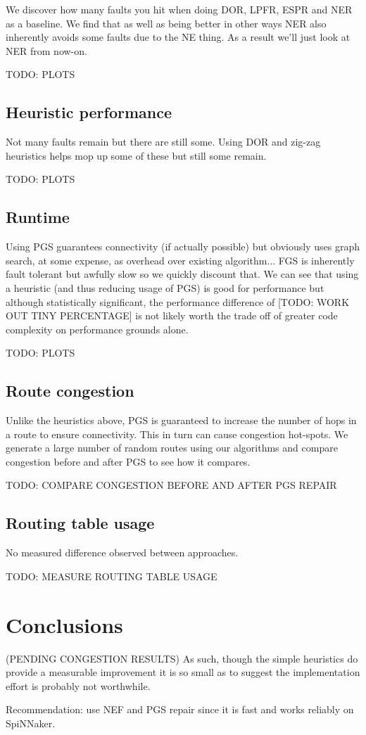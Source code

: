 			We discover how many faults you hit when doing DOR, LPFR, ESPR and NER
			as a baseline. We find that as well as being better in other ways NER
			also inherently avoids some faults due to the NE thing. As a result
			we'll just look at NER from now-on.
			
			TODO: PLOTS
		
		\subsection{Heuristic performance}
			
			Not many faults remain but there are still some. Using DOR and zig-zag
			heuristics helps mop up some of these but still some remain.
			
			TODO: PLOTS
		
		\subsection{Runtime}
			
			Using PGS guarantees connectivity (if actually possible) but obviously
			uses graph search, at some expense, as overhead over existing
			algorithm... FGS is inherently fault tolerant but awfully slow so we
			quickly discount that. We can see that using a heuristic (and thus
			reducing usage of PGS) is good for performance but although
			statistically significant, the performance difference of [TODO: WORK OUT
			TINY PERCENTAGE] is not likely worth the trade off of greater code
			complexity on performance grounds alone.
			
			TODO: PLOTS
		
		\subsection{Route congestion}
			
			Unlike the heuristics above, PGS is guaranteed to increase the number
			of hops in a route to ensure connectivity. This in turn can cause
			congestion hot-spots. We generate a large number of random routes using
			our algorithms and compare congestion before and after PGS to see how
			it compares.
			
			TODO: COMPARE CONGESTION BEFORE AND AFTER PGS REPAIR
		
		\subsection{Routing table usage}
			
			No measured difference observed between approaches.
			
			TODO: MEASURE ROUTING TABLE USAGE
		
	\section{Conclusions}
		
		(PENDING CONGESTION RESULTS) As such, though the simple heuristics do
		provide a measurable improvement it is so small as to suggest the
		implementation effort is probably not worthwhile.
		
		Recommendation: use NEF and PGS repair since it is fast and works
		reliably on SpiNNaker.
